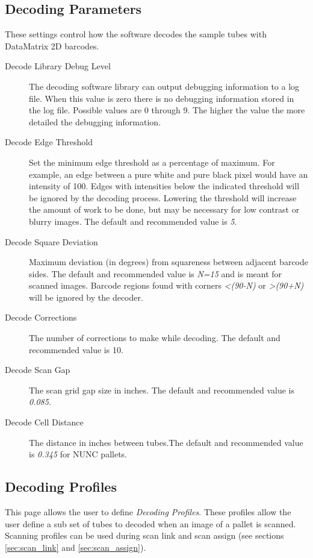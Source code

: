 \subsection{Decoding Parameters}
These settings control how the software decodes the sample tubes with
DataMatrix 2D barcodes.
\begin{description}
  \item[Decode Library Debug Level] The decoding software library can output
    debugging information to a log file. When this value is zero there is no
    debugging information stored in the log file. Possible values are 0 through
    9. The higher the value the more detailed the debugging information.
  \item[Decode Edge Threshold] Set the minimum edge threshold as a percentage
    of maximum. For example, an edge between a pure white and pure black pixel
    would have an intensity of 100.  Edges with intensities below the indicated
    threshold will be ignored by the decoding process. Lowering the threshold
    will increase the amount of work to be done, but may be necessary for low
    contrast or blurry images. The default and recommended value is \emph{5}.
  \item[Decode Square Deviation] Maximum deviation (in degrees) from squareness
    between adjacent barcode sides. The default and recommended value is
    \emph{N=15} and is meant for scanned images. Barcode regions found with
    corners \emph{<(90-N)} or \emph{>(90+N)} will be ignored by the decoder.
  \item[Decode Corrections] The number of corrections to make while
    decoding. The default and recommended value is 10.
  \item[Decode Scan Gap] The scan grid gap size in inches. The default and
    recommended value is \emph{0.085}.
  \item[Decode Cell Distance] The distance in inches between tubes.The default
    and recommended value is \emph{0.345} for NUNC pallets.
\end{description}

\subsection{Decoding Profiles}
This page allows the user to define \emph{Decoding Profiles}. These profiles
allow the user define a sub set of tubes to decoded when an image of a pallet
is scanned. Scanning profiles can be used during scan link and scan assign (see
sections \ref{sec:scan_link} and \ref{sec:scan_assign}).

